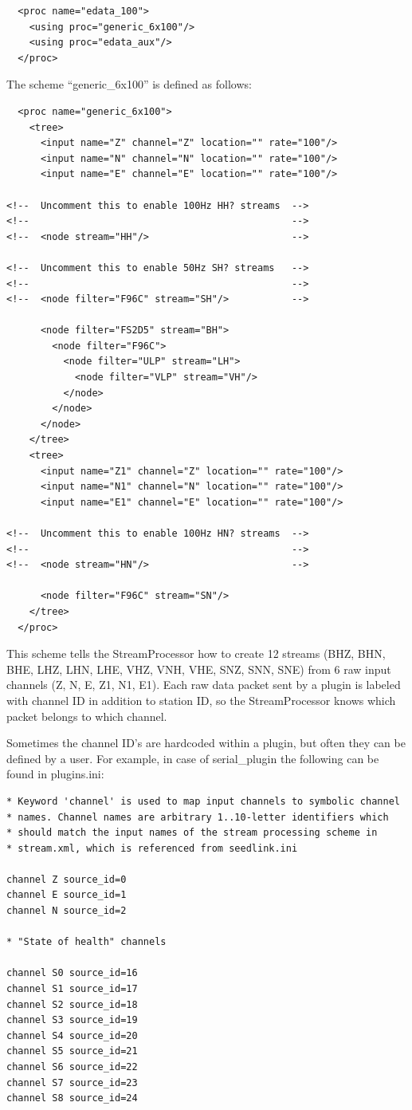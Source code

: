 \documentclass[11pt,a4paper,titlepage]{article}
\begin{document}
\begin{verbatim}
  <proc name="edata_100">
    <using proc="generic_6x100"/>
    <using proc="edata_aux"/>
  </proc>
\end{verbatim}

The scheme ``generic\_6x100'' is defined as follows:

\begin{verbatim}
  <proc name="generic_6x100">
    <tree>
      <input name="Z" channel="Z" location="" rate="100"/>
      <input name="N" channel="N" location="" rate="100"/>
      <input name="E" channel="E" location="" rate="100"/>
  
<!--  Uncomment this to enable 100Hz HH? streams  -->
<!--                                              -->
<!--  <node stream="HH"/>                         -->

<!--  Uncomment this to enable 50Hz SH? streams   -->
<!--                                              -->
<!--  <node filter="F96C" stream="SH"/>           -->

      <node filter="FS2D5" stream="BH">
        <node filter="F96C">
          <node filter="ULP" stream="LH">
            <node filter="VLP" stream="VH"/>
          </node> 
        </node>
      </node>
    </tree>
    <tree>
      <input name="Z1" channel="Z" location="" rate="100"/>
      <input name="N1" channel="N" location="" rate="100"/>
      <input name="E1" channel="E" location="" rate="100"/>

<!--  Uncomment this to enable 100Hz HN? streams  -->
<!--                                              -->
<!--  <node stream="HN"/>                         -->

      <node filter="F96C" stream="SN"/>
    </tree>
  </proc>
\end{verbatim}

This scheme tells the StreamProcessor how to create 12 streams (BHZ, BHN,
BHE, LHZ, LHN, LHE, VHZ, VNH, VHE, SNZ, SNN, SNE) from 6 raw input channels
(Z, N, E, Z1, N1, E1). Each raw data packet sent by a plugin is labeled
with channel ID in addition to station ID, so the StreamProcessor knows
which packet belongs to which channel.

Sometimes the channel ID's are hardcoded within a plugin, but often they
can be defined by a user. For example, in case of serial\_plugin the
following can be found in plugins.ini:

\begin{verbatim}
* Keyword 'channel' is used to map input channels to symbolic channel
* names. Channel names are arbitrary 1..10-letter identifiers which
* should match the input names of the stream processing scheme in
* stream.xml, which is referenced from seedlink.ini

channel Z source_id=0
channel E source_id=1
channel N source_id=2

* "State of health" channels

channel S0 source_id=16
channel S1 source_id=17
channel S2 source_id=18
channel S3 source_id=19
channel S4 source_id=20
channel S5 source_id=21
channel S6 source_id=22
channel S7 source_id=23
channel S8 source_id=24
\end{verbatim}
\end{document}
